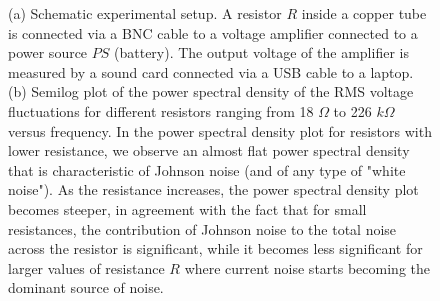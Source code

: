 \begin{linenumbers}
\begin{figure}
\caption{(a) Schematic experimental setup. A resistor $R$ inside a copper tube is connected via a BNC cable to a voltage amplifier connected to a power source $PS$ (battery). The output voltage of the amplifier is measured by a sound card connected via a USB cable to a laptop. (b) Semilog plot of the power spectral density of the RMS voltage fluctuations for different resistors ranging from 18 $\Omega$ to 226 $k\Omega$ versus frequency. In the power spectral density plot for resistors with lower resistance, we observe an almost flat power spectral density that is characteristic of Johnson noise (and of any type of "white noise"). As the resistance increases, the power spectral density plot becomes steeper, in agreement with the fact that for small resistances, the contribution of Johnson noise to the total noise across the resistor is significant, while it becomes less significant for larger values of resistance $R$ where current noise starts becoming the dominant source of noise.}
\label{fig:circuit} 
\end{figure}


\end{linenumbers}
